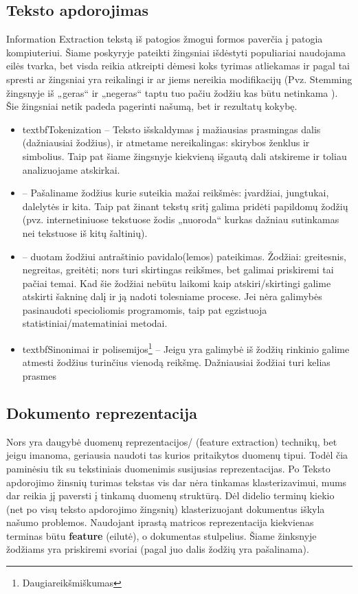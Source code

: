 \documentclass{VUMIFInfKursinis}
\begin{document}
	\subsection{Teksto apdorojimas}
	Information Extraction
		 tekstą iš patogios žmogui formos paverčia į patogia kompiuteriui. Šiame poskyryje pateikti žingsniai išdėstyti populiariai naudojama eilės tvarka, bet visda reikia atkreipti dėmesi koks tyrimas atliekamas ir pagal tai spresti ar žingsniai yra reikalingi ir ar jiems nereikia modifikacijų (Pvz. Stemming žingsnyje iš „geras“ ir „negeras“ taptu tuo pačiu žodžiu kas būtu netinkama ). Šie žingsniai netik padeda pagerinti našumą, bet ir rezultatų kokybę\cite{mugunthadevi2011survey}.
		\begin{itemize}
			\item textbf{Tokenization} – Teksto išskaldymas į mažiausias prasmingas dalis (dažniausiai žodžius), ir atmetame nereikalingas: skirybos ženklus ir simbolius. Taip pat šiame žingsnyje kiekvieną išgautą dali atskireme ir toliau analizuojame atskirkai.
			\item {} – Pašaliname žodžius kurie suteikia mažai reikšmės: įvardžiai, jungtukai, dalelytės ir kita. Taip pat žinant tekstų sritį galima pridėti papildomų žodžių (pvz. internetiniuose tekstuose žodis „nuoroda“ kurkas dažniau sutinkamas nei tekstuose iš kitų šaltinių).
			\item {} – duotam žodžiui antraštinio pavidalo(lemos) pateikimas.  Žodžiai: greitesnis, negreitas, greitėti; nors turi skirtingas reikšmes, bet galimai priskiremi tai pačiai temai. Kad šie žodžiai nebūtu laikomi kaip atskiri/skirtingi galime atskirti šakninę dalį ir ją nadoti tolesniame procese. Jei nėra galimybės pasinaudoti specioliomis programomis, taip pat egzistuoja statistiniai/matematiniai metodai. 
			\item textbf{Sinonimai ir polisemijos\footnote{Daugiareikšmiškumas}} – Jeigu yra galimybė iš žodžių rinkinio galime atmesti žodžius turinčius vienodą reikšmę. Dažniausiai žodžiai turi kelias prasmes 
		\end{itemize}

	\subsection{Dokumento reprezentacija}
		Nors yra daugybė duomenų reprezentacijos/ (feature extraction) technikų, bet jeigu imanoma, geriausia naudoti tas kurios pritaikytos duomenų tipui\cite{alelyani2013feature}. Todėl čia paminėsiu tik su tekstiniais duomenimis susijusias reprezentacijas.
		Po Teksto apdorojimo žinsnių turimas tekstas vis dar nėra tinkamas klasterizavimui, mums dar reikia jį paversti į tinkamą duomenų struktūrą. Dėl didelio terminų kiekio (net po visų teksto apdorojimo žingsnių) klasterizuojant dokumentus iškyla našumo problemos. Naudojant iprastą matricos reprezentacija kiekvienas terminas būtu \textbf{feature} (eilutė), o dokumentas stulpelius. Šiame žinksnyje žodžiams yra priskiremi svoriai (pagal juo dalis žodžių yra pašalinama).
\end{document}
